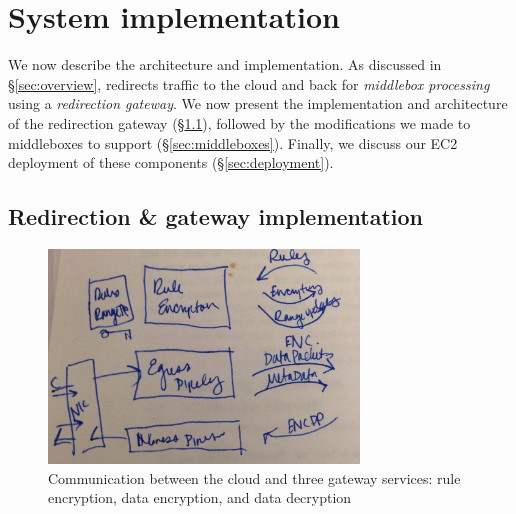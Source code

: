 
\section{System implementation} \label{sec:impl}

We now describe the \sys architecture and implementation. 
As discussed in \S\ref{sec:overview}, \sys redirects traffic to the cloud and back for {\it middlebox processing} using a {\it redirection gateway}.
We now present the implementation and architecture of the redirection gateway (\S\ref{sec:gateway}), followed by the modifications we made to middleboxes to support \sys (\S\ref{sec:middleboxes}).
Finally, we discuss our EC2 deployment of these components (\S\ref{sec:deployment}).


\subsection{Redirection \& gateway implementation}
\label{sec:gateway}

\begin{figure}[t]
  \centering
  \includegraphics[width=3.25in]{fig/gatway_metaarch.JPG}
  \caption[]{\label{fig:gatewaymeta} Communication between the cloud and three gateway services: rule encryption, data encryption, and data decryption}
\end{figure}



